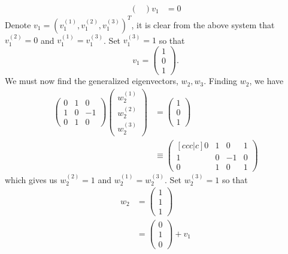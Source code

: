\documentclass{article}
\begin{document}
\begin{itemize}
\begin{align*}
\begin{pmatrix}
        \end{pmatrix}v_1 &= 0
    \end{align*}
    Denote $v_1 = (v_1^{(1)}, v_1^{(2)}, v_1^{(3)})^T$, it is clear from the above system that $v_1^{(2)} = 0$ and $v_1^{(1)} = v_1^{(3)}$. Set $v_1^{(3)} = 1$ so that
    \[v_1 = \begin{pmatrix}
        1\\
        0\\
        1
    \end{pmatrix}.\]
    We must now find the generalized eigenvectors, $w_2, w_3$. Finding $w_2$, we have
    \begin{align*}
        \begin{pmatrix}
            0 & 1 & 0\\
            1 & 0 & -1\\
            0 & 1 & 0
        \end{pmatrix}\begin{pmatrix}
            w_2^{(1)}\\
            w_2^{(2)}\\
            w_2^{(3)}
        \end{pmatrix} &= \begin{pmatrix}
            1\\
            0\\
            1
        \end{pmatrix}\\
        &\equiv \begin{pmatrix}[ccc|c]
            0 & 1 & 0 & 1\\
            1 & 0 & -1 & 0\\
            0 & 1 & 0 & 1
        \end{pmatrix}
    \end{align*}
    which gives us $w_2^{(2)} = 1$ and $w_2^{(1)} = w_2^{(3)}$. Set $w_2^{(3)} = 1$ so that
    \begin{align*}
        w_2 &= \begin{pmatrix}
            1\\
            1\\
            1
        \end{pmatrix}\\
        &= \begin{pmatrix}
            0\\
            1\\
            0
        \end{pmatrix} + v_1
    \end{align*}

\end{itemize}
\end{document}
